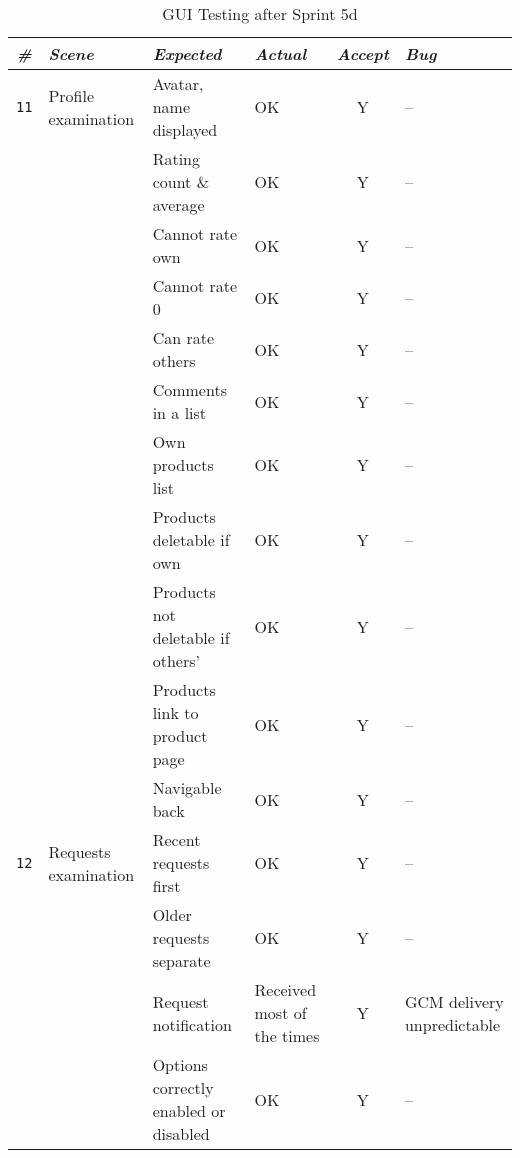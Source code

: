 \begin{sidewaystable}
\centering
    \begin{tabularx}{\textwidth}{cbbbcb}
    \toprule
    \centering
    \emph{\textbf{\#}} & \emph{\textbf{Scene}} & \emph{\textbf{Expected}} & \emph{\textbf{Actual}} & \emph{\textbf{Accept}} & \emph{\textbf{Bug}} \\
    \midrule
    \texttt{11}
    		& Profile examination
    		& Avatar, name displayed
    		& OK
    		& Y
    		& -- \\
    		\cline{3-6} \noalign{\smallskip}
    		&& Rating count \& average
    		& OK
    		& Y
    		& --\\
    		\cline{3-6} \noalign{\smallskip}
    		&& Cannot rate own
    		& OK
    		& Y
    		& --\\
    		\cline{3-6} \noalign{\smallskip}
    		&& Cannot rate 0
    		& OK
    		& Y
    		& --\\
    		\cline{3-6} \noalign{\smallskip}
    		&& Can rate others
    		& OK
    		& Y
    		& --\\
    		\cline{3-6} \noalign{\smallskip}
    		&& Comments in a list
    		& OK
    		& Y
    		& --\\
    		\cline{3-6} \noalign{\smallskip}
    		&& Own products list
    		& OK
    		& Y
    		& --\\
    		\cline{3-6} \noalign{\smallskip}
    		&& Products deletable if own
    		& OK
    		& Y
    		& --\\
    		\cline{3-6} \noalign{\smallskip}
    		&& Products not deletable if others'
    		& OK
    		& Y
    		& --\\
    		\cline{3-6} \noalign{\smallskip}
    		&& Products link to product page
    		& OK
    		& Y
    		& --\\
    		\cline{3-6} \noalign{\smallskip}
    		&& Navigable back
    		& OK
    		& Y
    		& --\\
    \midrule
    \texttt{12}
    		& Requests examination
    		& Recent requests first
    		& OK
    		& Y
    		& -- \\
    		\cline{3-6} \noalign{\smallskip}
    		&& Older requests separate
    		& OK
    		& Y
    		& --\\
    		\cline{3-6} \noalign{\smallskip}
    		&& Request notification
    		& Received most of the times
    		& Y
    		& GCM delivery unpredictable\\
    		\cline{3-6} \noalign{\smallskip}
    		&& Options correctly enabled or disabled
    		& OK
    		& Y
    		& --\\
    \bottomrule
    \hline
    \end{tabularx}
    \caption{GUI Testing after Sprint 5d}
    \label{table:table:gui-test4}
\end{sidewaystable}

